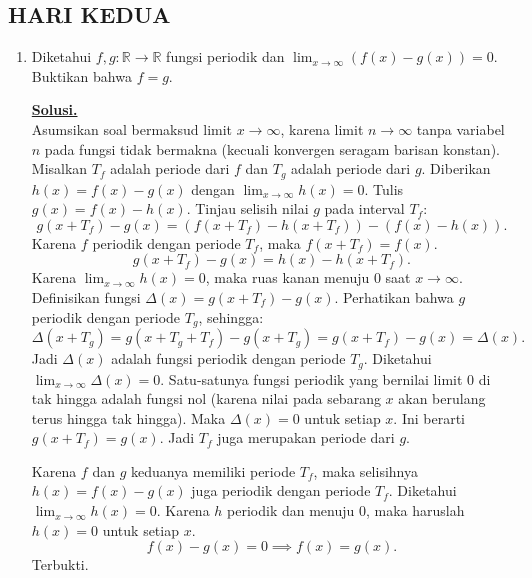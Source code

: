 \documentclass[12pt,twoside]{article}
\newenvironment{solution}
{
	\par\noindent\textbf{\underline{Solusi.}}\\
}
{
	\par
}
\begin{document}
\subsection{HARI KEDUA}
\begin{enumerate}
  \item Diketahui $f,g:\mathbb{R}\to\mathbb{R}$ fungsi periodik dan $\displaystyle\lim_{x\to\infty}\left(f(x)-g(x)\right)=0$. Buktikan bahwa $f=g$.
        \begin{solution}
          Asumsikan soal bermaksud limit $x \to \infty$, karena limit $n \to \infty$ tanpa variabel $n$ pada fungsi tidak bermakna (kecuali konvergen seragam barisan konstan).
          Misalkan $T_f$ adalah periode dari $f$ dan $T_g$ adalah periode dari $g$.
          Diberikan $h(x) = f(x) - g(x)$ dengan $\lim_{x \to \infty} h(x) = 0$.
          Tulis $g(x) = f(x) - h(x)$.
          Tinjau selisih nilai $g$ pada interval $T_f$:
          $$ g(x+T_f) - g(x) = (f(x+T_f) - h(x+T_f)) - (f(x) - h(x)). $$
          Karena $f$ periodik dengan periode $T_f$, maka $f(x+T_f) = f(x)$.
          $$ g(x+T_f) - g(x) = h(x) - h(x+T_f). $$
          Karena $\lim_{x \to \infty} h(x) = 0$, maka ruas kanan menuju 0 saat $x \to \infty$.
          Definisikan fungsi $\Delta(x) = g(x+T_f) - g(x)$.
          Perhatikan bahwa $g$ periodik dengan periode $T_g$, sehingga:
          $$ \Delta(x+T_g) = g(x+T_g+T_f) - g(x+T_g) = g(x+T_f) - g(x) = \Delta(x). $$
          Jadi $\Delta(x)$ adalah fungsi periodik dengan periode $T_g$.
          Diketahui $\lim_{x \to \infty} \Delta(x) = 0$.
          Satu-satunya fungsi periodik yang bernilai limit 0 di tak hingga adalah fungsi nol (karena nilai pada sebarang $x$ akan berulang terus hingga tak hingga).
          Maka $\Delta(x) = 0$ untuk setiap $x$.
          Ini berarti $g(x+T_f) = g(x)$. Jadi $T_f$ juga merupakan periode dari $g$.

          Karena $f$ dan $g$ keduanya memiliki periode $T_f$, maka selisihnya $h(x) = f(x) - g(x)$ juga periodik dengan periode $T_f$.
          Diketahui $\lim_{x \to \infty} h(x) = 0$.
          Karena $h$ periodik dan menuju 0, maka haruslah $h(x) = 0$ untuk setiap $x$.
          $$ f(x) - g(x) = 0 \implies f(x) = g(x). $$
          Terbukti.
        \end{solution}



\end{enumerate}
\end{document}

